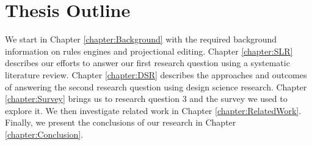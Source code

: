 \section{Thesis Outline}

We start in Chapter \ref{chapter:Background} with the required background information on rules engines and projectional editing.
Chapter \ref{chapter:SLR} describes our efforts to answer our first research question using a systematic literature review. 
Chapter \ref{chapter:DSR} describes the approaches and outcomes of answering the second research question using design science research. 
Chapter \ref{chapter:Survey} brings us to research question 3 and the survey we used to explore it.
We then investigate related work in Chapter \ref{chapter:RelatedWork}.
Finally, we present the conclusions of our research in Chapter \ref{chapter:Conclusion}.
